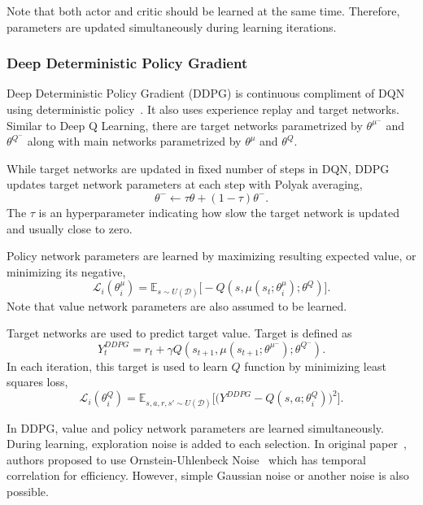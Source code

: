 Note that both actor and critic should be learned at the same time. Therefore, parameters are updated simultaneously during learning iterations. 

\subsubsection{Deep Deterministic Policy Gradient}
Deep Deterministic Policy Gradient (DDPG) is continuous compliment of DQN using deterministic policy~\cite{lillicrap_continuous_2019}. 
It also uses experience replay and target networks. 
Similar to Deep Q Learning, there are target networks parametrized by $\theta^{\mu^-}$ and $\theta^{Q^-}$ 
along with main networks parametrized by $\theta^{\mu}$ and $\theta^{Q}$. 

While target networks are updated in fixed number of steps in DQN, 
DDPG updates target network parameters at each step with Polyak averaging, 
\begin{equation}
\label{eqn:target_update}
\theta^- \leftarrow \tau \theta + (1-\tau) \theta^- .
\end{equation}
The $\tau$ is an hyperparameter indicating how slow the target network is updated and usually close to zero. 

Policy network parameters are learned by maximizing resulting expected value, or minimizing its negative,
\begin{equation}
\label{eqn:ddpg_policy_loss}
\mathcal{L}_i(\theta^\mu_i) = \mathbb{E}_{s \sim U(\mathcal{D})} \Big[ -Q(s, \mu(s_t;\theta^\mu_i);\theta^Q) \Big].
\end{equation} 
Note that value network parameters are also assumed to be learned. 

Target networks are used to predict target value. Target is defined as 
\begin{equation}
\label{eqn:ddpg_target}
Y_t^{DDPG} = r_t + \gamma Q(s_{t+1}, \mu(s_{t+1};\theta^{\mu^-});\theta^{Q^-}).
\end{equation}
In each iteration, this target is used to learn $Q$ function by minimizing least squares loss, 
\begin{equation}
\label{eqn:ddpg_loss}
\mathcal{L}_i(\theta^Q_i) = \mathbb{E}_{s,a,r,s'\sim U(\mathcal{D})}\Big[\big( Y^{DDPG} - Q(s,a;\theta^Q_i) \big) ^ 2 \Big].
\end{equation}

In DDPG, value and policy network parameters are learned simultaneously. 
During learning, exploration noise is added to each selection. 
In original paper~\cite{lillicrap_continuous_2019}, authors proposed to use Ornstein-Uhlenbeck Noise~\cite{uhlenbeck_theory_1930} which has temporal correlation for efficiency. 
However, simple Gaussian noise or another noise is also possible. 

